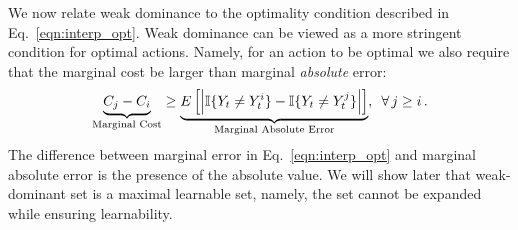 We now relate weak dominance to the optimality condition described in Eq.~\eqref{eqn:interp_opt}. Weak dominance can be viewed as a more stringent condition for optimal actions. Namely, for an action to be optimal we also require that the marginal cost be larger than marginal \emph{absolute} error:
\begin{equation} \label{eqn:interp_WD}
\underbrace{C_j - C_i}_{\text{Marginal Cost}} \geq \underbrace{ E \left [ \left | \mathbb{I}\{Y_t \ne Y_t^i\} - \mathbb{I}\{Y_t \ne Y_t^j\} \right | \right ]}_{\text{Marginal Absolute Error}},\,\,\, \forall \, j \geq i\,.
\end{equation}
The difference between marginal error in Eq.~\eqref{eqn:interp_opt} and marginal absolute error is the presence of the absolute value. We will show later that weak-dominant set is a maximal learnable set, namely, the set cannot be expanded while ensuring learnability.


